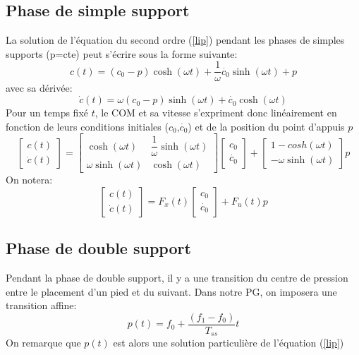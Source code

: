 \documentclass[10pt,a4paper]{article}
\begin{document}
\subsection{Phase de simple support}
La solution de l'équation du second ordre (\ref{lip}) pendant les phases de simples supports (p=cte) peut s'écrire sous la forme suivante:
\begin{equation}
c(t)=(c_0-p)\cosh(\omega t)+\dfrac{1}{\omega}\dot{c_0}\sinh(\omega t)+p
\end{equation}
avec sa dérivée:
\begin{equation}
\dot{c}(t)=\omega(c_0-p)\sinh(\omega t)+\dot{c_0}\cosh(\omega t)
\end{equation}
Pour un temps fixé $t$, le COM et sa vitesse s'expriment donc linéairement en fonction de leurs conditions initiales ($c_0$,$\dot{c_0}$) et de la position du point d'appuis $p$
\begin{equation}
\begin{bmatrix} 
c(t) \\
\dot{c}(t) 
\end{bmatrix} 
= 
\begin{bmatrix} 
\cosh(\omega t) 		&	 \dfrac{1}{\omega}\sinh(\omega t) \\
\omega\sinh(\omega t)	&	 \cosh(\omega t)
\end{bmatrix}
\begin{bmatrix} 
c_0 \\
\dot{c_0}
\end{bmatrix} 
+
\begin{bmatrix} 
1-cosh(\omega t) 		 \\
-\omega\sinh(\omega t)	
\end{bmatrix}
p
\end{equation}
On notera:
\begin{equation}
\begin{bmatrix} 
c(t) \\
\dot{c}(t) 
\end{bmatrix} 
= 
F_x(t)
\begin{bmatrix} 
c_0 \\
\dot{c_0}
\end{bmatrix} 
+
F_u(t) p
\end{equation}
\subsection{Phase de double support}
Pendant la phase de double support, il y a une transition du centre de pression entre le placement d'un pied et du suivant. Dans notre PG, on imposera une transition affine:
\begin{equation}
p(t)=f_0+\frac{(f_1-f_0)}{T_{ss}}t
\end{equation}
On remarque que $p(t)$ est alors une solution particulière de l'équation (\ref{lip}) 
\end{document}
